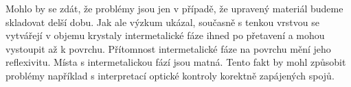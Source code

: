 Mohlo by se zdát, že problémy jsou jen v případě, že upravený materiál budeme skladovat
delší dobu. Jak ale výzkum ukázal, současně s tenkou vrstvou se vytvářejí v objemu krystaly intermetalické fáze ihned po přetavení a mohou vystoupit až k povrchu. Přítomnost intermetalické fáze na povrchu mění jeho reflexivitu. Místa s intermetalickou fází jsou matná. Tento fakt by mohl způsobit problémy například s interpretací optické kontroly korektně zapájených
spojů. 


















